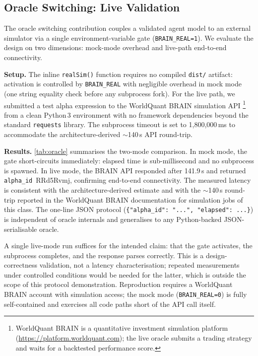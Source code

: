 \documentclass[10pt,twocolumn]{article}
\begin{document}
\subsection{Oracle Switching: Live Validation}
\label{sec:exp:oracle}

The oracle switching contribution couples a validated agent model to an external
simulator via a single environment-variable gate (\texttt{BRAIN\_REAL=1}).
We evaluate the design on two dimensions: mock-mode overhead and live-path
end-to-end connectivity.

\textbf{Setup.}  The inline \texttt{realSim()} function requires no compiled
\texttt{dist/} artifact: activation is controlled by \texttt{BRAIN\_REAL}
with negligible overhead in mock mode (one string equality check before any
subprocess fork).  For the live path, we submitted a test alpha expression
to the WorldQuant BRAIN simulation API%
\footnote{WorldQuant BRAIN is a quantitative investment simulation platform (\url{https://platform.worldquant.com}); the live oracle submits a trading strategy and waits for a backtested performance score.}%
from a clean Python\,3 environment with no framework dependencies beyond
the standard \texttt{requests} library.  The subprocess timeout is set to
1,800,000\,ms to accommodate the architecture-derived $\sim$140\,s API
round-trip.

\textbf{Results.}  \cref{tab:oracle} summarises the two-mode comparison.
In mock mode, the gate short-circuits immediately: elapsed time is
sub-millisecond and no subprocess is spawned.  In live mode, the BRAIN API
responded after 141.9\,s and returned \texttt{alpha\_id}~RRd5Rvmj, confirming
end-to-end connectivity.  The measured latency is consistent with the
architecture-derived estimate and with the $\sim$140\,s round-trip reported in
the WorldQuant BRAIN documentation for simulation jobs of this class.  The
one-line JSON protocol (\texttt{\{"alpha\_id": "...", "elapsed": ...\}}) is
independent of oracle internals and generalises to any Python-backed
JSON-serialisable oracle.

A single live-mode run suffices for the intended claim: that the gate
activates, the subprocess completes, and the response parses correctly.
This is a design-correctness validation, not a latency characterisation;
repeated measurements under controlled conditions would be needed for
the latter, which is outside the scope of this protocol demonstration.
Reproduction requires a WorldQuant BRAIN account with simulation
access; the mock mode (\texttt{BRAIN\_REAL=0}) is fully self-contained
and exercises all code paths short of the API call itself.
\end{document}
